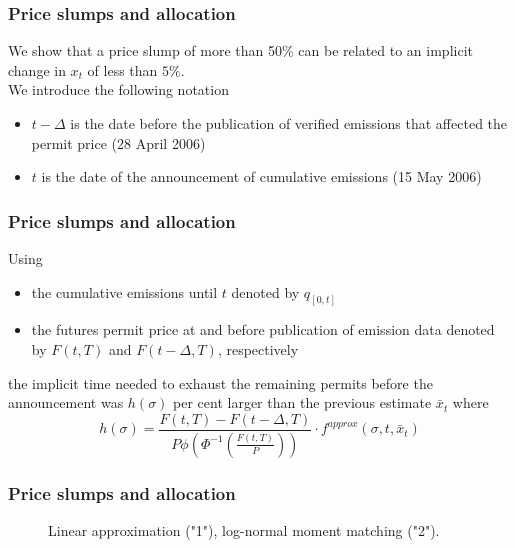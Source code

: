 \begin{frame}
  \frametitle{Price slumps and allocation}
We show that a price slump of more than 50\% can be related to an implicit change in $x_t$ of less than $5\%$.\\

We introduce the following notation
\begin{itemize}
  \item $t - \Delta$ is the date before the publication of verified emissions that affected the permit price (28 April 2006)
  \item $t$ is the date of the announcement of cumulative emissions (15 May 2006)
\end{itemize}
\end{frame}

\begin{frame}
  \frametitle{Price slumps and allocation}
Using
\begin{itemize}
  \item the cumulative emissions until $t$ denoted by $q_{[0,t]}$
  \item the futures permit price at and before publication of emission data denoted by $F(t,T)$ and $F(t - \Delta,T)$, respectively
\end{itemize}
the implicit time needed to exhaust the remaining permits before the announcement was $h(\sigma)$ per cent larger than the previous estimate $\bar{x}_t$ where
$$
h(\sigma) = \frac{F(t,T) - F(t-\Delta,T)}{P \phi\left( \Phi^{-1}\left(\frac{F(t,T)}{P}\right) \right)} \cdot f^{approx}(\sigma,t,\bar{x}_t)
$$
\end{frame}

\begin{frame}
  \frametitle{Price slumps and allocation}
\begin{center}
\begin{figure}[h!]
\centering
{}
\caption{Linear approximation ("1"), log-normal moment matching ("2").}
\label{fig:plot11}
\end{figure}
\end{center}
\end{frame}


